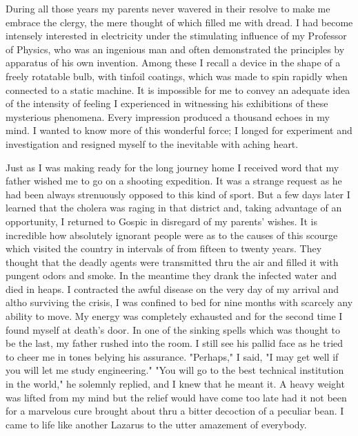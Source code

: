 \documentclass[a4paper,12pt,english,twoside,openright]{memoir}
\begin{document}
During all those years my parents never wavered in their resolve to make me embrace the clergy, 
the mere thought of which filled me with dread.  I had become intensely interested in electricity 
under the stimulating influence of my Professor of Physics, who was an ingenious man and often 
demonstrated the principles by apparatus of his own invention.  Among these I recall a device in 
the shape of a freely rotatable bulb, with tinfoil coatings, which was made to spin rapidly when 
connected to a static machine.  It is impossible for me to convey an adequate idea of the intensity 
of feeling I experienced in witnessing his exhibitions of these mysterious phenomena.  Every 
impression produced a thousand echoes in my mind.  I wanted to know more of this wonderful 
force; I longed for experiment and investigation and resigned myself to the inevitable with aching 
heart.  

Just as I was making ready for the long journey home I received word that my father wished me 
to go on a shooting expedition.  It was a strange request as he had been always strenuously 
opposed to this kind of sport.  But a few days later I learned that the cholera was raging in that 
district and, taking advantage of an opportunity, I returned to Gospic in disregard of my parents' 
wishes.  It is incredible how absolutely ignorant people were as to the causes of this scourge 
which visited the country in intervals of from fifteen to twenty years.  They thought that the deadly 
agents were transmitted thru the air and filled it with pungent odors and smoke.  In the meantime 
they drank the infected water and died in heaps.  I contracted the awful disease on the very day 
of my arrival and altho surviving the crisis, I was confined to bed for nine months with scarcely 
any ability to move.  My energy was completely exhausted and for the second time I found myself 
at death's door.  In one of the sinking spells which was thought to be the last, my father rushed 
into the room.  I still see his pallid face as he tried to cheer me in tones belying his assurance.  
"Perhaps," I said, "I may get well if you will let me study engineering." "You will go to the best 
technical institution in the world," he solemnly replied, and I knew that he meant it.  A heavy 
weight was lifted from my mind but the relief would have come too late had it not been for a 
marvelous cure brought about thru a bitter decoction of a peculiar bean.  I came to life like 
another Lazarus to the utter amazement of everybody.  
\end{document}
